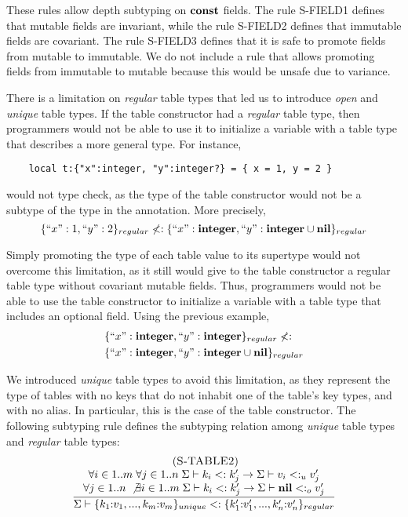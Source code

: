 These rules allow depth subtyping on $\mathbf{const}$ fields.
The rule \textsc{S-FIELD1} defines that mutable fields are invariant,
while the rule \textsc{S-FIELD2} defines that immutable fields are covariant.
The rule \textsc{S-FIELD3} defines that it is safe to promote fields
from mutable to immutable.
We do not include a rule that allows promoting fields from immutable
to mutable because this would be unsafe due to variance.

There is a limitation on \emph{regular} table types that led us to
introduce \emph{open} and \emph{unique} table types.
If the table constructor had a \emph{regular} table type, then
programmers would not be able to use it to initialize a variable with
a table type that describes a more general type.
For instance,
\begin{verbatim}
    local t:{"x":integer, "y":integer?} = { x = 1, y = 2 }
\end{verbatim}
would not type check, as the type of the table constructor would not
be a subtype of the type in the annotation.
More precisely,
\[
\{``x":1, ``y":2\}_{regular} \not<: \{``x":\mathbf{integer}, ``y":\mathbf{integer} \cup \mathbf{nil}\}_{regular}
\]

Simply promoting the type of each table value to its supertype would
not overcome this limitation, as it still would give to the table constructor
a regular table type without covariant mutable fields.
Thus, programmers would not be able to use the table constructor to
initialize a variable with a table type that includes an optional field.
Using the previous example,
\begin{align*}
& \{``x":\mathbf{integer}, ``y":\mathbf{integer}\}_{regular} \not<: \\
& \{``x":\mathbf{integer}, ``y":\mathbf{integer} \cup \mathbf{nil}\}_{regular}
\end{align*}

We introduced \emph{unique} table types to avoid this limitation,
as they represent the type of tables with no keys that do not
inhabit one of the table's key types, and with no alias.
In particular, this is the case of the table constructor.
The following subtyping rule defines the subtyping relation among
\emph{unique} table types and \emph{regular} table types:
\[
\begin{array}{c}
\; (\textsc{S-TABLE2})\\
\dfrac{\begin{array}{c}
       \forall i \in 1..m \; \forall j \in 1..n \;
       \Sigma \vdash k_{i} <: k_{j}' \to \Sigma \vdash v_{i} <:_{u} v_{j}' \\
       \forall j \in 1..n \; \not\exists i \in 1..m \;
       \Sigma \vdash k_{i} <: k_{j}' \to \Sigma \vdash \mathbf{nil} <:_{o} v_{j}'
       \end{array}}
      {\Sigma \vdash \{k_{1}{:}v_{1}, ..., k_{m}{:}v_{m}\}_{unique} <:
                    \{k_{1}'{:}v_{1}', ..., k_{n}'{:}v_{n}'\}_{regular}}
\end{array}
\]

